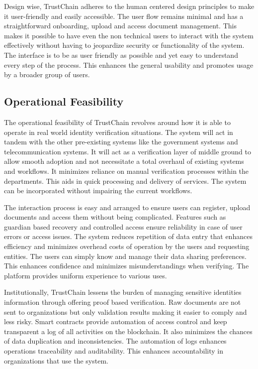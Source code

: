 Design wise, TrustChain adheres to the human centered design principles to make it user-friendly and easily accessible. The user flow remains minimal and has a straightforward onboarding, upload and access document management. This makes it possible to have even the non technical users to interact with the system effectively without having to jeopardize security or functionality of the system. The interface is to be as user friendly as possible and yet easy to understand every step of the process. This enhances the general usability and promotes usage by a broader group of users.
\subsection{Operational Feasibility}

The operational feasibility of TrustChain revolves around how it is able to operate in real world identity verification situations. The system will act in tandem with the other pre-existing systems like the government systems and telecommunication systems. It will act as a verification layer of middle ground to allow smooth adoption and not necessitate a total overhaul of existing systems and workflows. It minimizes reliance on manual verification processes within the departments. This aids in quick processing and delivery of services. The system can be incorporated without impairing the current workflows.

The interaction process is easy and arranged to ensure users can register, upload documents and access them without being complicated. Features such as guardian based recovery and controlled access ensure reliability in case of user errors or access issues. The system reduces repetition of data entry that enhances efficiency and minimizes overhead costs of operation by the users and requesting entities. The users can simply know and manage their data sharing preferences. This enhances confidence and minimizes misunderstandings when verifying. The platform provides uniform experience to various uses.

Institutionally, TrustChain lessens the burden of managing sensitive identities information through offering proof based verification. Raw documents are not sent to organizations but only validation results making it easier to comply and less risky. Smart contracts provide automation of access control and keep transparent a log of all activities on the blockchain. It also minimizes the chances of data duplication and inconsistencies. The automation of logs enhances operations traceability and auditability. This enhances accountability in organizations that use the system.

